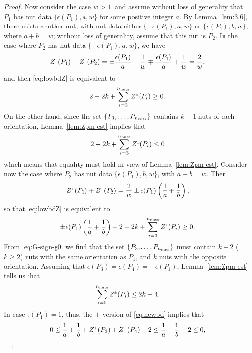 \documentclass[a4paper,11pt,reqno]{amsart}
\newcommand{\nut}{P}
\theoremstyle{plain}
\newcommand{\nnuts}{n_{\text{\rm nuts}}}
\renewcommand{\P}[1]{{{#1}^{\hspace{-.5pt}\scaleto{+}{4pt}}}}
\newcommand{\PM}[1]{{{#1}^{\hspace{-.5pt}\scaleto{\pm}{3.5pt}}}}
\numberwithin{equation}{section}
\begin{document}
\begin{proof}
Now consider the case $w>1$, and assume without loss of generality that $\nut_1$ has nut data $\{\epsilon(\nut_1),a,w\}$ for some positive integer $a$. By Lemma~\ref{lem:3.6}, there exists another nut, with nut data either $\{-\epsilon(\nut_1),a,w\}$ or $\{\epsilon(\nut_1),b,w\}$, where $a+b=w$; without loss of generality, assume that this nut is $\nut_2$.
In the case where $\nut_2$ has nut data $\{-\epsilon(\nut_1),a,w\}$, we have 
\begin{align}
\PM{Z}(\nut_1) + \PM{Z}(\nut_2)
=
\pm\frac{\epsilon(\nut_1)}{a} + \frac{1}{w}\mp\frac{\epsilon(\nut_1)}{a} + \frac{1}{w}
=
\frac{2}{w},
\end{align} 
and then \eqref{eq:lowbdZ} is equivalent to 
\begin{align}
2 - 2k + \sum_{i=3}^{\nnuts}\PM{Z}(\nut_i) \geq 0.
\end{align} 
On the other hand, since the set $\{\nut_3,\dots,\nut_{\nnuts}\}$ contains $k-1$ nuts of each orientation, Lemma~\ref{lem:Zpm-est} implies that 
\begin{align} \label{eq:upbdZ}
2 - 2k + \sum_{i=3}^{\nnuts}\PM{Z}(\nut_i) \leq 0
\end{align} 
which means that equality must hold in view of Lemma~\ref{lem:Zpm-est}. Consider now the case where $\nut_2$ has nut data $\{\epsilon(\nut_1),b,w\}$, with $a+b=w$. Then 
\begin{align}
\PM{Z}(\nut_1) + \PM{Z}(\nut_2)=\frac{2}{w}\pm\epsilon(\nut_1)\left (\frac{1}{a}+\frac{1}{b} \right),
\end{align} 
so that \eqref{eq:lowbdZ} is equivalent to 
\begin{align} \label{eq:newbd}
\pm\epsilon(\nut_1)\left(\frac{1}{a}+\frac{1}{b}\right)
+2 - 2k + \sum_{i=3}^{\nnuts} \PM{Z}(\nut_i) \geq 0.
\end{align} 
From \eqref{eq:G-sign-g0} we find that the set $\{\nut_3,\dots,\nut_{\nnuts}\}$ must contain $k-2$ ($k \ge 2$) nuts with the same orientation as $\nut_1$, and $k$ nuts with the opposite orientation. Assuming that $\epsilon(\nut_3)=\epsilon(\nut_4)=-\epsilon(\nut_1)$, Lemma~\ref{lem:Zpm-est} tells us that
\begin{align}
\sum_{i=5}^{\nnuts} \PM{Z}(\nut_i) \leq 2k-4.
\end{align}
In case $\epsilon(\nut_1)=1$, thus, the $+$ version of \eqref{eq:newbd} implies that 
\begin{align} 
0\leq\frac{1}{a}+\frac{1}{b} + \P{Z}(\nut_3) + \P{Z}(\nut_4)-2\leq\frac{1}{a}+\frac{1}{b}-2\leq 0,
\end{align}

\end{proof}
\end{document}
